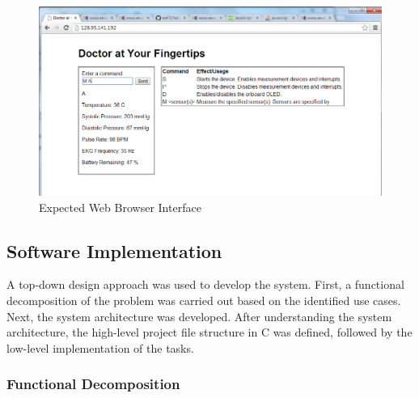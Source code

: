 \documentclass[12pt]{article} %
\begin{document}
\begin{itemize}
		\begin{figure}[h]
			\centering
			\includegraphics[width=\textwidth]{../design/web_browser.png}
			\caption{Expected Web Browser Interface}
			\label{fig:web_UI}
		\end{figure}
\end{itemize}

    \subsection{Software Implementation}

    A top-down design approach was used to develop the system. First, a functional
    decomposition of the problem was carried out based on the identified use cases.
    Next, the system architecture was developed. After understanding the system
    architecture, the high-level project file structure in C was defined, followed
    by the low-level implementation of the tasks.

    \subsubsection{Functional Decomposition}

\end{document}
